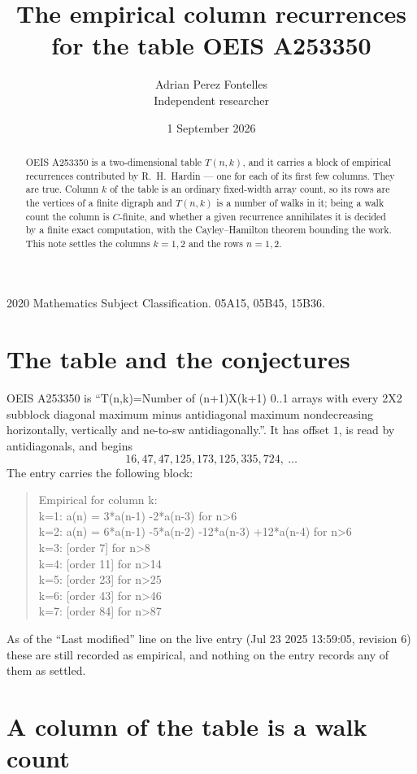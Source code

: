 \documentclass[11pt,a4paper]{article}
\title{The empirical column recurrences for the table OEIS A253350}
\author{Adrian Perez Fontelles\\ \small Independent researcher}
\date{1 September 2026}
\theoremstyle{plain}
\theoremstyle{definition}
\begin{document}
\maketitle

\begin{abstract}
OEIS A253350 is a two-dimensional table $T(n,k)$, and it carries a block of empirical
recurrences contributed by R.~H.~Hardin --- one for each of its first few columns. They are
true. Column $k$ of the table is an ordinary fixed-width array count, so its rows are the
vertices of a finite digraph and $T(n,k)$ is a number of walks in it; being a walk count the
column is $C$-finite, and whether a given recurrence annihilates it is decided by a finite
exact computation, with the Cayley--Hamilton theorem bounding the work. This note settles the columns $k=1, 2$ and the rows $n=1, 2$.
\end{abstract}

\noindent\small 2020 Mathematics Subject Classification. 05A15, 05B45, 15B36.\normalsize

\section{The table and the conjectures}

OEIS A253350 is ``T(n,k)=Number of (n+1)X(k+1) 0..1 arrays with every 2X2 subblock diagonal maximum minus antidiagonal maximum nondecreasing horizontally, vertically and ne-to-sw antidiagonally.''. It has offset $1$, is
read by antidiagonals, and begins
\[
16, 47, 47, 125, 173, 125, 335, 724,\ \dots
\]
The entry carries the following block:
\begin{quote}\small
Empirical for column k:\\
k=1: a(n) = 3*a(n-1) -2*a(n-3) for n>6\\
k=2: a(n) = 6*a(n-1) -5*a(n-2) -12*a(n-3) +12*a(n-4) for n>6\\
k=3: [order 7] for n>8\\
k=4: [order 11] for n>14\\
k=5: [order 23] for n>25\\
k=6: [order 43] for n>46\\
k=7: [order 84] for n>87\\
\end{quote}
As of the ``Last modified'' line on the live entry (Jul 23 2025 13:59:05, revision 6) these are still
recorded as empirical, and nothing on the entry records any of them as settled.

\section{A column of the table is a walk count}
\end{document}
